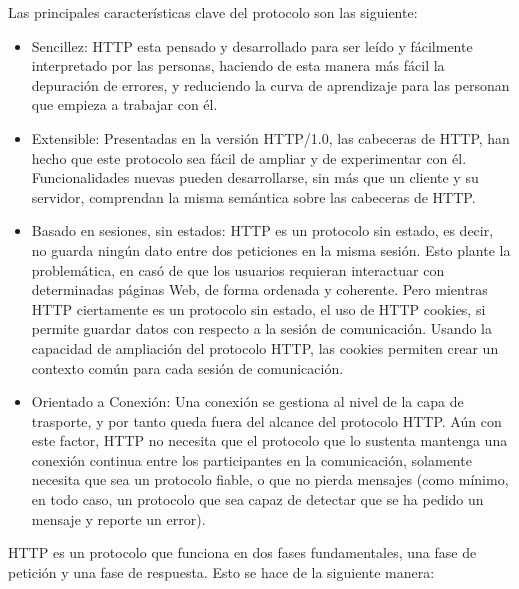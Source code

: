 Las principales características clave del protocolo son las siguiente:
\begin{itemize}
\item Sencillez: HTTP esta pensado y desarrollado para ser leído y fácilmente interpretado por las personas, haciendo de esta manera más fácil la depuración de errores, y reduciendo la curva de aprendizaje para las personan que empieza a trabajar con él.
\item Extensible: Presentadas en la versión HTTP/1.0, las cabeceras de HTTP, han hecho que este protocolo sea fácil de ampliar y de experimentar con él. Funcionalidades nuevas pueden desarrollarse, sin más que un cliente y su servidor, comprendan la misma semántica sobre las cabeceras de HTTP.
\item Basado en sesiones, sin estados: HTTP es un protocolo sin estado, es decir, no guarda ningún dato entre dos peticiones en la misma sesión. Esto plante la problemática, en casó de que los usuarios requieran interactuar con determinadas páginas Web, de forma ordenada y coherente. Pero mientras HTTP ciertamente es un protocolo sin estado, el uso de HTTP cookies, si permite guardar datos con respecto a la sesión de comunicación. Usando la capacidad de ampliación del protocolo HTTP, las cookies permiten crear un contexto común para cada sesión de comunicación.
\item Orientado a Conexión: Una conexión se gestiona al nivel de la capa de trasporte, y por tanto queda fuera del alcance del protocolo HTTP. Aún con este factor, HTTP no necesita que el protocolo que lo sustenta mantenga una conexión continua entre los participantes en la comunicación, solamente necesita que sea un protocolo fiable, o que no pierda mensajes (como mínimo, en todo caso, un protocolo que sea capaz de detectar que se ha pedido un mensaje y reporte un error).
\end{itemize}

HTTP es un protocolo que funciona en dos fases fundamentales, una fase de petición y una fase de respuesta. Esto se hace de la siguiente manera:


